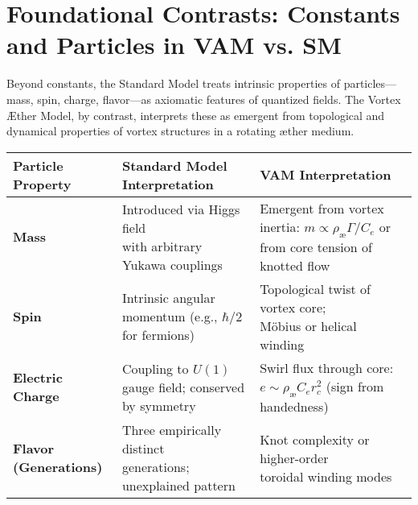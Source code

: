 \section*{Foundational Contrasts: Constants and Particles in VAM vs. SM}

Beyond constants, the Standard Model treats intrinsic properties of particles—mass, spin, charge, flavor—as axiomatic features of quantized fields. The Vortex Æther Model, by contrast, interprets these as emergent from topological and dynamical properties of vortex structures in a rotating æther medium.

\begin{table}[H]
    \centering
    \footnotesize
    \renewcommand{\arraystretch}{1.3}
    \begin{tabular}{|l|l|l|}
        \hline
        \textbf{Particle Property} & \textbf{Standard Model Interpretation} & \textbf{VAM Interpretation} \\
        \hline

        \textbf{Mass} &
        \makecell[l]{Introduced via Higgs field \\ with arbitrary Yukawa couplings} &
        \makecell[l]{Emergent from vortex inertia: \\ $m \propto \rho_\text{\ae} \Gamma / C_e$ \\ or from core tension of knotted flow} \\
        \hline

        \textbf{Spin} &
        \makecell[l]{Intrinsic angular momentum \\ (e.g., $\hbar/2$ for fermions)} &
        \makecell[l]{Topological twist of vortex core; \\ Möbius or helical winding} \\
        \hline

        \textbf{Electric Charge} &
        \makecell[l]{Coupling to $U(1)$ gauge field; \\ conserved by symmetry} &
        \makecell[l]{Swirl flux through core: \\ $e \sim \rho_\text{\ae} C_e r_c^2$ \\ (sign from handedness)} \\
        \hline

        \textbf{Flavor (Generations)} &
        \makecell[l]{Three empirically distinct \\ generations; unexplained pattern} &
        \makecell[l]{Knot complexity or higher-order \\ toroidal winding modes} \\
        \hline


\end{tabular}
\end{table}
